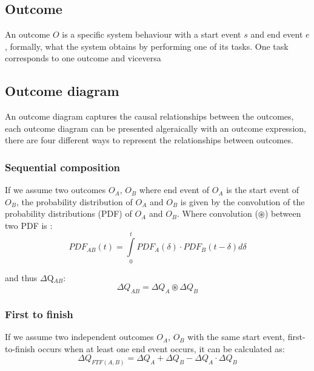     \subsection{Outcome}
        An outcome $O$ is a specific system behaviour with a start event $s$ and end event $e$, formally, what the system obtains by performing one of its tasks. One task corresponds to one outcome and viceversa
    \subsection{Outcome diagram}
        An outcome diagram captures the causal relationships between the outcomes, each outcome diagram can be presented algeraically with an outcome expression, there are four different ways to represent the relationships between outcomes.

    \subsubsection{Sequential composition}
        If we assume two outcomes $O_A$, $O_B$ where end event of $O_A$ is the start event of $O_B$, the probability distribution of $O_A$ and $O_B$ is given by the convolution of the probability distributions (PDF) of $O_A$ and $O_B$.
        Where convolution ($\circledast$) between two PDF is :
        \begin{equation}
            PDF_{AB}(t) =\int\limits_0^t PDF_A(\delta) \cdot PDF_B(t-\delta)d\delta 
            \label{eq:}
        \end{equation}

            and thus $\Delta$Q$_{AB}$:
        \begin{equation}
            \Delta Q_{AB} = \Delta Q_A \circledast \Delta Q_B
            \label{eq:}
        \end{equation}
        
    \subsubsection{First to finish}
            If we assume two independent outcomes $O_A$, $O_B$ with the same start event, first-to-finish occurs when at least one end event occurs, it can be calculated as:
        \begin{equation}
            \Delta Q_{FTF(A, B)} = \Delta Q_A + \Delta Q_B - \Delta Q_A \cdot \Delta Q_B  
            \label{eq:ftf}
        \end{equation}
            

